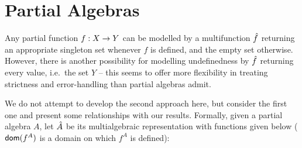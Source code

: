 \documentclass[10pt]{article}
\begin{document}

\section{Partial Algebras}
\label{se:pa}

Any partial function $f : X \rightarrow Y$ can be modelled by a
multifunction $\hat{f}$ returning an appropriate singleton set whenever
$f$ is defined, and the empty set
otherwise. However, there is another possibility for modelling
undefinedness by $\hat{f}$
returning every value, i.e.\ the set $Y$ -- this seems to
offer more flexibility in treating strictness and error-handling than
 partial algebras admit.

We do not attempt to develop the second approach here, but consider the first one
and present some relationships with our results.
Formally, given a partial algebra $A$, let $\hat{A}$ be its
multialgebraic representation with functions given below ($\mbox{\sf dom}(f^A)$ is
a domain on which $f^A$ is defined):  
% 
\end{document}
